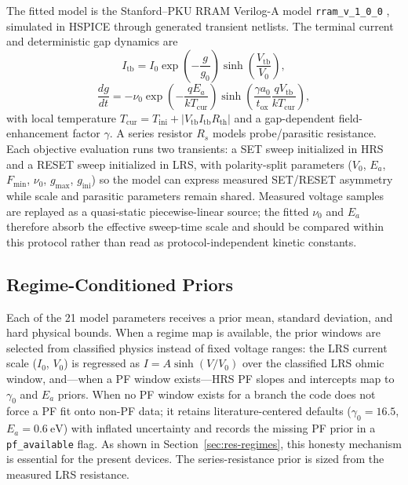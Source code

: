 \documentclass[journal]{IEEEtran}
\begin{document}
The fitted model is the Stanford--PKU RRAM Verilog-A model
\texttt{rram\_v\_1\_0\_0} \cite{guan2012spice,jiang2016verification},
simulated in HSPICE through generated transient netlists.  The terminal
current and deterministic gap dynamics are
\begin{equation}
  I_{\mathrm{tb}}
  = I_0 \exp\left(-\frac{g}{g_0}\right)
    \sinh\left(\frac{V_{\mathrm{tb}}}{V_0}\right),
  \label{eq:stanford-current}
\end{equation}
\begin{equation}
  \frac{dg}{dt}
  =
  -\nu_0
  \exp\left(-\frac{qE_a}{kT_{\mathrm{cur}}}\right)
  \sinh\left(
    \frac{\gamma a_0}{t_{\mathrm{ox}}}
    \frac{qV_{\mathrm{tb}}}{kT_{\mathrm{cur}}}
  \right),
  \label{eq:stanford-gap}
\end{equation}
with local temperature
$T_{\mathrm{cur}} = T_{\mathrm{ini}} +
|V_{\mathrm{tb}}I_{\mathrm{tb}}R_{\mathrm{th}}|$ and a gap-dependent
field-enhancement factor $\gamma$.  A series resistor $R_s$ models
probe/parasitic resistance.  Each objective evaluation runs two transients:
a SET sweep initialized in HRS and a RESET sweep initialized in LRS, with
polarity-split parameters ($V_0$, $E_a$, $F_{\min}$, $\nu_0$, $g_{\max}$,
$g_{\mathrm{ini}}$) so the model can express measured SET/RESET asymmetry
while scale and parasitic parameters remain shared.  Measured voltage
samples are replayed as a quasi-static piecewise-linear source; the fitted
$\nu_0$ and $E_a$ therefore absorb the effective sweep-time scale and should
be compared within this protocol rather than read as protocol-independent
kinetic constants.

\subsection{Regime-Conditioned Priors}
\label{sec:priors}

Each of the 21 model parameters receives a prior mean, standard deviation,
and hard physical bounds.  When a regime map is available, the prior
windows are selected from classified physics instead of fixed voltage
ranges: the LRS current scale ($I_0$, $V_0$) is regressed as
$I=A\sinh(V/V_0)$ over the classified LRS ohmic window, and---when a PF
window exists---HRS PF slopes and intercepts map to $\gamma_0$ and $E_a$
priors.  When no PF window exists for a branch the code does not force a PF
fit onto non-PF data; it retains literature-centered defaults
($\gamma_0=16.5$, $E_a=\SI{0.6}{\electronvolt}$) with inflated uncertainty
and records the missing PF prior in a \texttt{pf\_available} flag.  As shown
in Section~\ref{sec:res-regimes}, this honesty mechanism is essential for the
present devices.  The series-resistance prior is sized from the measured LRS
resistance.
\end{document}
